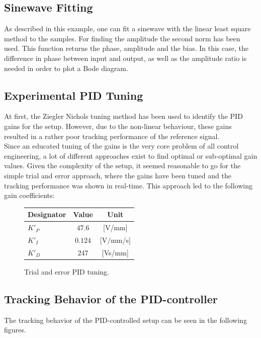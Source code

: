 \subsection{Sinewave Fitting}
As described in this example\cite{exnumerus2010}, one can fit a sinewave with the linear least square method to the samples. For finding the amplitude the second norm has been used. This function returns the phase, amplitude and the bias. In this case, the difference in phase between input and output, as well as the amplitude ratio is needed in order to plot a Bode diagram.


\subsection{Experimental PID Tuning}
At first, the Ziegler Nichols tuning method has been used to identify the PID gains for the setup. However, due to the non-linear behaviour, these gains resulted in a rather poor tracking performance of the reference signal.\\
Since an educated tuning of the gains is the very core problem of all control engineering, a lot of different approaches exist to find optimal or sub-optimal gain values. Given the complexity of the setup, it seemed reasonable to go for the simple trial and error approach, where the gains have been tuned and the tracking performance was shown in real-time. This approach led to the following gain coefficients:

\begin{figure}[h!]
	\centering
	\begin{tabular}{|l|c|c|}
		\hline
		Designator & Value & Unit \\ \hline \hline
		$K'_P$ & $47.6$ & [V/mm]\\ 
		$K'_I$ & $0.124$ & [V/mm/s]\\
		$K'_D$ & $247$ & [Vs/mm]\\
		\hline
	\end{tabular}
	\caption{Trial and error PID tuning.}
	\label{tab:trial_error_pid}
\end{figure}


\subsection{Tracking Behavior of the PID-controller}
The tracking behavior of the PID-controlled setup can be seen in the following figures.



